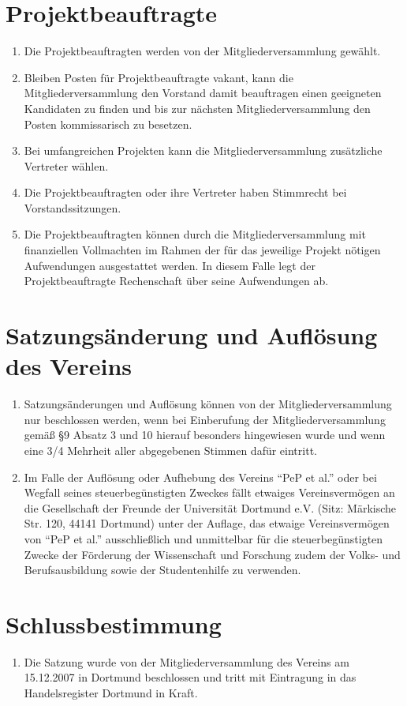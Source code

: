 \documentclass[
  fontsize=12pt,
  paper=a4,
  DIV14,
  parskip,
]{scrartcl}
\begin{document}
\section{Projektbeauftragte}

\begin{enumerate}
	\item Die Projektbeauftragten werden von der Mitgliederversammlung gewählt.
	\item Bleiben Posten für Projektbeauftragte vakant, kann die
		Mitgliederversammlung den Vorstand damit beauftragen einen geeigneten
		Kandidaten zu finden und bis zur nächsten Mitgliederversammlung den Posten
		kommissarisch zu besetzen.
 	\item Bei umfangreichen Projekten kann die Mitgliederversammlung zusätzliche
		Vertreter wählen.
	\item Die Projektbeauftragten oder ihre Vertreter haben Stimmrecht bei
		Vorstandssitzungen.
	\item Die Projektbeauftragten können durch die Mitgliederversammlung mit
		finanziellen Vollmachten im Rahmen der für das jeweilige Projekt nötigen
		Aufwendungen ausgestattet werden. In diesem Falle legt der
		Projektbeauftragte Rechenschaft über seine Aufwendungen ab.
\end{enumerate}

\section{Satzungsänderung und Auflösung des Vereins}

\begin{enumerate}
	\item Satzungsänderungen und Auflösung können von der Mitgliederversammlung
		nur beschlossen werden, wenn bei Einberufung der Mitgliederversammlung
		gemäß §9 Absatz 3 und 10 hierauf besonders hingewiesen wurde und wenn eine
		3/4 Mehrheit aller abgegebenen Stimmen dafür eintritt.
	\item Im Falle der Auflösung oder Aufhebung des Vereins \enquote{PeP et	al.}
    oder bei Wegfall seines steuerbegünstigten Zweckes fällt
		etwaiges Vereinsvermögen an die Gesellschaft der Freunde der Universität
		Dortmund e.V. (Sitz: Märkische Str. 120, 44141 Dortmund) unter der Auflage,
		das etwaige Vereinsvermögen von \enquote{PeP et al.} ausschließlich und
		unmittelbar für die steuerbegünstigten Zwecke der Förderung der Wissenschaft
		und Forschung zudem der Volks- und Berufsausbildung sowie der Studentenhilfe
		zu verwenden.
\end{enumerate}

\section{Schlussbestimmung}

\begin{enumerate}
	\item Die Satzung wurde von der Mitgliederversammlung des Vereins am
		15.12.2007 in Dortmund beschlossen und tritt mit Eintragung in das
		Handelsregister Dortmund in Kraft.
\end{enumerate}
\end{document}
